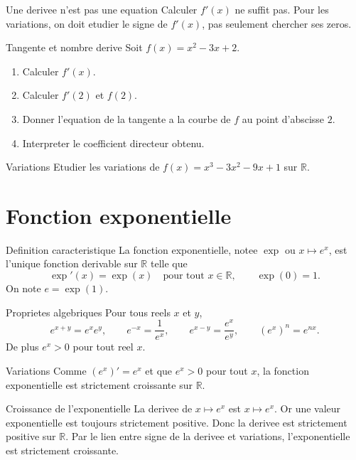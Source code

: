 \documentclass[11pt,a4paper]{article}
\newcommand{\R}{\mathbb{R}}
\begin{document}
\begin{boiteattention}{Une derivee n'est pas une equation}
Calculer $f'(x)$ ne suffit pas. Pour les variations, on doit etudier le signe de $f'(x)$, pas seulement chercher ses zeros.
\end{boiteattention}

\begin{exobox}{Tangente et nombre derive}
Soit $f(x)=x^2-3x+2$.
\begin{enumerate}
  \item Calculer $f'(x)$.
  \item Calculer $f'(2)$ et $f(2)$.
  \item Donner l'equation de la tangente a la courbe de $f$ au point d'abscisse $2$.
  \item Interpreter le coefficient directeur obtenu.
\end{enumerate}
\end{exobox}

\begin{exobox}{Variations}
Etudier les variations de $f(x)=x^3-3x^2-9x+1$ sur $\R$.
\end{exobox}


\section{Fonction exponentielle}

\begin{boitecours}{Definition caracteristique}
La fonction exponentielle, notee $\exp$ ou $x\mapsto e^x$, est l'unique fonction derivable sur $\R$ telle que
\[
\exp'(x)=\exp(x)\quad\text{pour tout }x\in\R,
\qquad \exp(0)=1.
\]
On note $e=\exp(1)$.
\end{boitecours}

\begin{boitecours}{Proprietes algebriques}
Pour tous reels $x$ et $y$,
\[
e^{x+y}=e^xe^y,
\qquad e^{-x}=\frac1{e^x},
\qquad e^{x-y}=\frac{e^x}{e^y},
\qquad (e^x)^n=e^{nx}.
\]
De plus $e^x>0$ pour tout reel $x$.
\end{boitecours}

\begin{boitecours}{Variations}
Comme $(e^x)'=e^x$ et que $e^x>0$ pour tout $x$, la fonction exponentielle est strictement croissante sur $\R$.
\end{boitecours}

\begin{boitepreuve}{Croissance de l'exponentielle}
La derivee de $x\mapsto e^x$ est $x\mapsto e^x$. Or une valeur exponentielle est toujours strictement positive. Donc la derivee est strictement positive sur $\R$. Par le lien entre signe de la derivee et variations, l'exponentielle est strictement croissante.
\end{boitepreuve}
\end{document}
